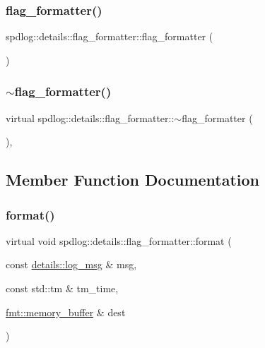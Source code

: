 \subsubsection{\texorpdfstring{flag\+\_\+formatter()}{flag\_formatter()}\hspace{0.1cm}{\footnotesize\ttfamily [2/2]}}
{\footnotesize\ttfamily spdlog\+::details\+::flag\+\_\+formatter\+::flag\+\_\+formatter (\begin{DoxyParamCaption}{ }\end{DoxyParamCaption})\hspace{0.3cm}{\ttfamily [default]}}

\mbox{\label{classspdlog_1_1details_1_1flag__formatter_a104f93112896f70c5dedf970240ef12b}} 
\subsubsection{\texorpdfstring{$\sim$flag\+\_\+formatter()}{~flag\_formatter()}}
{\footnotesize\ttfamily virtual spdlog\+::details\+::flag\+\_\+formatter\+::$\sim$flag\+\_\+formatter (\begin{DoxyParamCaption}{ }\end{DoxyParamCaption})\hspace{0.3cm}{\ttfamily [virtual]}, {\ttfamily [default]}}



\subsection{Member Function Documentation}
\mbox{\label{classspdlog_1_1details_1_1flag__formatter_a33fb3e42a4c8200cceb833d92b53fb67}} 
\subsubsection{\texorpdfstring{format()}{format()}}
{\footnotesize\ttfamily virtual void spdlog\+::details\+::flag\+\_\+formatter\+::format (\begin{DoxyParamCaption}\item[{const \hyperlink{structspdlog_1_1details_1_1log__msg}{details\+::log\+\_\+msg} \&}]{msg,  }\item[{const std\+::tm \&}]{tm\+\_\+time,  }\item[{\hyperlink{format_8h_a21cbf729f69302f578e6db21c5e9e0d2}{fmt\+::memory\+\_\+buffer} \&}]{dest }\end{DoxyParamCaption})\hspace{0.3cm}{\ttfamily [pure virtual]}}




